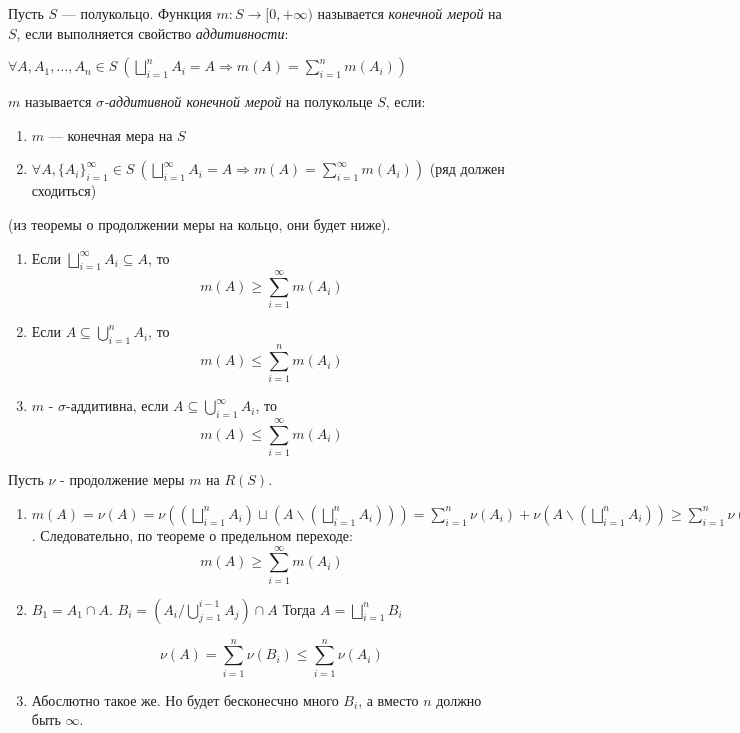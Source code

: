 
\Def Пусть $S$ — полукольцо. Функция $m : S \rightarrow [0, +\infty)$ называется \textit{конечной мерой} на $S$, если выполняется свойство \textit{аддитивности}:

$\forall A, A_1, \dots , A_n \in S\ (\bigsqcup^n_{i=1} A_i = A \Rightarrow m(A) = \sum^n_{i=1} m(A_i))$

\Def $m$ называется \textit{$\sigma$-аддитивной конечной мерой} на полукольце $S$, если:
\begin{enumerate}
    \item $m$ — конечная мера на $S$
    \item $\forall A, \{A_i\}^{\infty}_{i=1} \in S\ (\bigsqcup^{\infty}_{i=1} A_i = A \Rightarrow m(A) = \sum^{\infty}_{i=1} m(A_i))$ (ряд должен сходиться)
\end{enumerate}

\Conseq (из теоремы о продолжении меры на кольцо, они будет ниже).
\begin{enumerate}
    \item Если $\bigsqcup_{i=1}^{\infty} A_i \subseteq A$, то 
$$m(A) \geq \sum^{\infty}_{i=1} m(A_i)$$
    \item Если $A \subseteq
\bigcup_{i=1}^n A_i$, то 
$$m(A) \leq \sum^n_{i=1} m(A_i)$$
    \item $m$ - $\sigma$-аддитивна, если $A \subseteq \bigcup^{\infty}_{i=1} A_i$, то $$m(A) \leq \sum^{\infty}_{i=1} m(A_i)$$
\end{enumerate}
\Proof
Пусть $\nu$ - продолжение меры $m$ на $R(S)$.
\begin{enumerate}
    \item $m(A) = \nu(A) = \nu((\bigsqcup^n_{i=1} A_i) \sqcup (A \backslash (\bigsqcup^n_{i=1} A_i))) = \sum^n_{i = 1} \nu(A_i) + \nu(A \backslash (\bigsqcup^n_{i=1} A_i)) \geq \sum^n_{i = 1} \nu(A_i) = \sum^n_{i = 1} m(A_i)$. Следовательно, по теореме о предельном переходе:
    $$m(A) \geq \sum^{\infty}_{i=1} m(A_i)$$
    
    \item $B_1 = A_1 \cap A$.
    $B_i = (A_i / \bigcup_{j = 1}^{i-1} A_j) \cap A$
    Тогда $A = \bigsqcup_{i=1}^n B_i$
    
    $$\nu(A) = \sum^{n}_{i = 1}\nu(B_i) \leq \sum^{n}_{i = 1}\nu(A_i)$$
    
    \item Абослютно такое же. Но будет бесконесчно много $B_i$, а вместо $n$ должно быть $\infty$. 
    
\end{enumerate}

